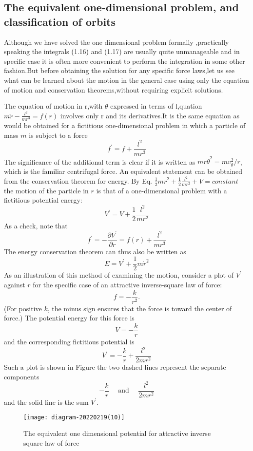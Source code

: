\subsection{The equivalent one-dimensional problem, and classification of orbits}
Although we have solved the one dimensional problem formally ,practically speaking the integrals (1.16) and (1.17) are usually quite unmanageable and in specific case it is often more convenient to perform the integration in some other fashion.But before obtaining the solution for any specific force laws,let us see what can be learned about the motion in the general case using only the equation of motion and conservation theorems,without requiring explicit solutions.
\par The equation of motion in r,with $\dot{\theta}$ expressed in terms of l,quation     $m\ddot{r}-\frac{l^2}{mr^3}=f(r)$ involves only r and its derivatives.It is the same equation as would be obtained  for a fictitious one-dimensional problem in which a particle of mass $m$ is subject to a force
$$f^{\prime}=f+\frac{l^{2}}{m r^{3}}$$
The significance of the additional term is clear if it is written as $m r \dot{\theta}^{2}=m v_{\theta}^{2} / r$, which is the familiar centrifugal force. An equivalent statement can be obtained from the conservation theorem for energy. By Eq. $\frac{1}{2}m\dot{r}^2+\frac{1}{2}\frac{l^2}{mr^2}+V=constant$ the motion of the particle in $r$ is that of a one-dimensional problem with a fictitious potential energy:\\
$$V^{\prime}=V+\frac{1}{2} \frac{l^{2}}{m r^{2}}$$
As a check, note that
$$
f^{\prime}=-\frac{\partial V^{\prime}}{\partial r}=f(r)+\frac{l^{2}}{m r^{3}}
$$
 The energy conservation theorem can thus also be written as
$$
E=V^{\prime}+\frac{1}{2} m \dot{r}^{2}
$$
As an illustration of this method of examining the motion, consider a plot of $V^{\prime}$ against $r$ for the specific case of an attractive inverse-square law of force:
$$
f=-\frac{k}{r^{2}} .
$$
(For positive $k$, the minus sign ensures that the force is toward the center of force.) The potential energy for this force is
$$
V=-\frac{k}{r}
$$
and the corresponding fictitious potential is
$$
V^{\prime}=-\frac{k}{r}+\frac{l^{2}}{2 m r^{2}}
$$
Such a plot is shown in Figure the two dashed lines represent the separate components
$$
-\frac{k}{r} \quad \text { and } \quad \frac{l^{2}}{2 m r^{2}}
$$
and the solid line is the sum $V^{\prime}$.
\begin{figure}[H]
	\centering
	\texttt{[image: diagram-20220219(10)]}
	\caption{The equivalent one dimensional potential for attractive inverse square law of force}
	\label{}
\end{figure}
